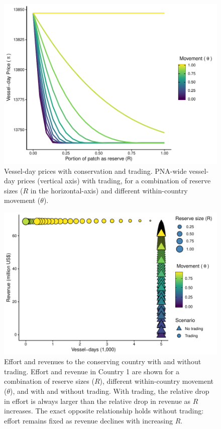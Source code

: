 \documentclass[12pt]{article}
\begin{document}
\begin{figure}
\centering
\includegraphics{img/vessel_day_price_with_trading_plot.pdf}
\caption{\label{fig:vessel_day_price_with_trading_plot}Vessel-day prices with conservation and trading. PNA-wide vessel-day prices (vertical axis) with trading, for a combination of reserve sizes ($R$ in the horizontal-axis) and different within-country movement ($\theta$).}
\end{figure}

\begin{figure}
	\centering
	\includegraphics{img/effort_and_revenues.pdf}
	\caption{\label{fig:effort_and_revenues}Effort and revenues to the conserving country with and without trading. Effort and revenue in Country 1 are shown for a combination of reserve sizes ($R$), different within-country movement ($\theta$), and with and without trading. With trading, the relative drop in effort is always larger than the relative drop in revenue as $R$ increases. The exact opposite relationship holds without trading: effort remains fixed as revenue declines with increasing $R$.}
\end{figure}
\end{document}
